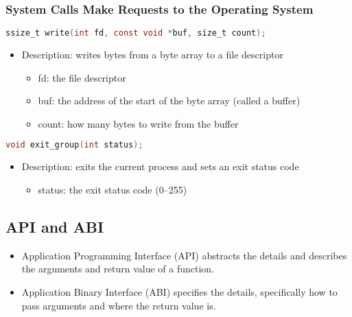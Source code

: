 \documentclass[twoside]{article}
\begin{document}
\subsubsection{System Calls Make Requests to the Operating System}
\begin{definition}
\begin{lstlisting}[language=C]
ssize_t write(int fd, const void *buf, size_t count);
\end{lstlisting}
\begin{itemize}
    \item Description: writes bytes from a byte array to a file descriptor
    \begin{itemize}
        \item fd: the file descriptor
        \item buf: the address of the start of the byte array (called a buffer)
        \item count: how many bytes to write from the buffer
    \end{itemize}
\end{itemize}

\begin{lstlisting}[language=C]
void exit_group(int status);
\end{lstlisting}

\begin{itemize}
    \item Description: exits the current process and sets an exit status code
    \begin{itemize}
        \item status: the exit status code (0–255)
    \end{itemize}
\end{itemize}  
\end{definition}

\subsection{API and ABI}
\begin{definition}
    \begin{itemize}
        \item Application Programming Interface (API) abstracts the details and describes the arguments and return value of a function.
        \item Application Binary Interface (ABI) specifies the details, specifically how to pass arguments and where the return value is.
    \end{itemize}
\end{definition}
\end{document}
